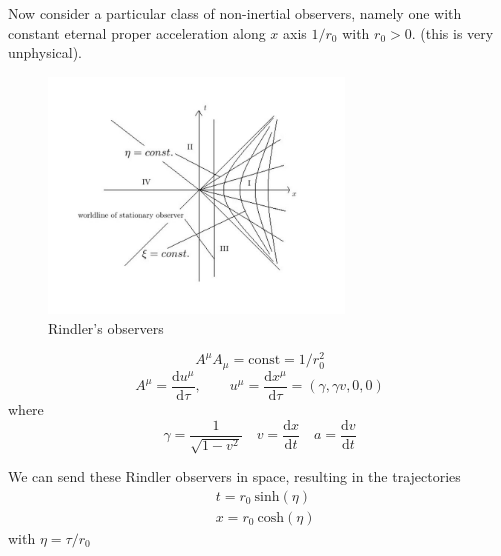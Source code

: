 \documentclass[a4paper]{book}
\theoremstyle{definition}
\theoremstyle{remark}
\begin{document}
Now consider a particular class of non-inertial observers, namely one with constant eternal proper acceleration along $x$ axis $1/r_0$ with $r_0 > 0$. (this is very unphysical). 
\begin{figure}
    \centering
    \includegraphics[width=0.7\textwidth]{rindler_coords}
    \caption{Rindler's observers}
\end{figure}
\begin{equation}
    A^\mu A_\mu = \text{const} = 1/r_0^2
\end{equation}
\begin{equation}
    A^\mu = \frac{\text{d} u^\mu}{\text{d}\tau}, \qquad u^\mu = \frac{\text{d}x^\mu}{\text{d}\tau} = (\gamma, \gamma v, 0, 0)
\end{equation}
where 
\begin{equation}
    \gamma = \frac{1}{\sqrt{1-v^2}} \quad v = \frac{\text{d}x}{\text{d}t} \quad a = \frac{\text{d}v}{\text{d}t}
\end{equation}

We can send these Rindler observers in space, resulting in the trajectories 
\begin{equation}
    \begin{aligned}
        &t = r_0 ~ \text{sinh}(\eta)\\
        &x = r_0 ~ \text{cosh}(\eta)
    \end{aligned}
\end{equation}
with $\eta = \tau/r_0$
\end{document}
